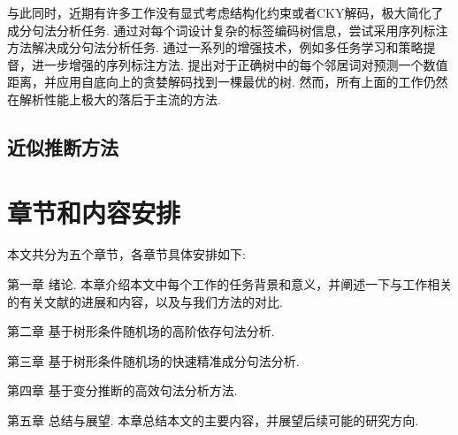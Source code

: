 与此同时，近期有许多工作没有显式考虑结构化约束或者CKY解码，极大简化了成分句法分析任务.
\citet{gomez-rodriguez-vilares-2018-constituent}通过对每个词设计复杂的标签编码树信息，尝试采用序列标注方法解决成分句法分析任务.
\citet{vilares-etal-2019-better}通过一系列的增强技术，例如多任务学习和策略提督，进一步增强的序列标注方法.
\citet{shen-etal-2018-straight}提出对于正确树中的每个邻居词对预测一个数值距离，并应用自底向上的贪婪解码找到一棵最优的树.
然而，所有上面的工作仍然在解析性能上极大的落后于主流的方法.

\subsection{近似推断方法}

\section{章节和内容安排}

本文共分为五个章节，各章节具体安排如下:

第一章 绪论. 本章介绍本文中每个工作的任务背景和意义，并阐述一下与工作相关的有关文献的进展和内容，以及与我们方法的对比.

第二章 基于树形条件随机场的高阶依存句法分析.

第三章 基于树形条件随机场的快速精准成分句法分析.

第四章 基于变分推断的高效句法分析方法.

第五章 总结与展望. 本章总结本文的主要内容，并展望后续可能的研究方向.